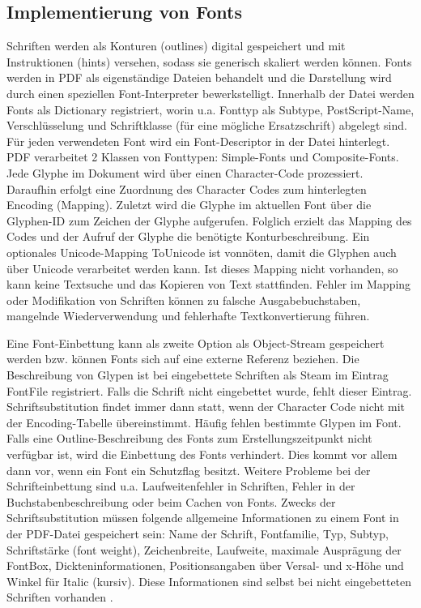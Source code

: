 \subsection{Implementierung von Fonts}
Schriften werden als Konturen (outlines) digital gespeichert und mit Instruktionen (hints) versehen, sodass sie generisch skaliert werden können. Fonts werden in PDF als eigenständige Dateien behandelt und die Darstellung wird durch einen speziellen Font-Interpreter bewerkstelligt. Innerhalb der Datei werden Fonts als Dictionary registriert, worin u.a. Fonttyp als Subtype, PostScript-Name, Verschlüsselung und Schriftklasse (für eine mögliche Ersatzschrift) abgelegt sind. Für jeden verwendeten Font wird ein Font-Descriptor in der Datei hinterlegt. PDF verarbeitet 2 Klassen von Fonttypen: Simple-Fonts und Composite-Fonts. Jede Glyphe im Dokument wird über einen Character-Code prozessiert. Daraufhin erfolgt eine Zuordnung des Character Codes zum hinterlegten Encoding (Mapping). Zuletzt wird die Glyphe im aktuellen Font über die Glyphen-ID zum Zeichen der Glyphe aufgerufen. Folglich erzielt das Mapping des Codes und der Aufruf der Glyphe die benötigte Konturbeschreibung. Ein optionales Unicode-Mapping ToUnicode ist vonnöten, damit die Glyphen auch über Unicode verarbeitet werden kann. Ist dieses Mapping nicht vorhanden, so kann keine Textsuche und das Kopieren von Text stattfinden. Fehler im Mapping oder Modifikation von Schriften können zu falsche Ausgabebuchstaben, mangelnde Wiederverwendung und fehlerhafte Textkonvertierung führen.
\par
Eine Font-Einbettung kann als zweite Option als Object-Stream gespeichert werden bzw. können Fonts sich auf eine externe Referenz beziehen. Die Beschreibung von Glypen ist bei eingebettete Schriften als Steam im Eintrag FontFile registriert. Falls die Schrift nicht eingebettet wurde, fehlt dieser Eintrag. Schriftsubstitution findet immer dann statt, wenn der Character Code nicht mit der Encoding-Tabelle übereinstimmt. Häufig fehlen bestimmte Glypen im Font. Falls eine Outline-Beschreibung des Fonts zum Erstellungszeitpunkt nicht verfügbar ist, wird die Einbettung des Fonts verhindert. Dies kommt vor allem dann vor, wenn ein Font ein Schutzflag besitzt. Weitere Probleme bei der Schrifteinbettung sind u.a. Laufweitenfehler in Schriften, Fehler in der Buchstabenbeschreibung oder beim Cachen von Fonts. Zwecks der Schriftsubstitution müssen folgende allgemeine Informationen zu einem Font in der PDF-Datei gespeichert sein: Name der Schrift, Fontfamilie, Typ, Subtyp, Schriftstärke (font weight), Zeichenbreite, Laufweite, maximale Ausprägung der FontBox, Dickteninformationen, Positionsangaben über Versal- und x-Höhe und Winkel für Italic (kursiv). Diese Informationen sind selbst bei nicht eingebetteten Schriften vorhanden \cite{schneeberger}. 